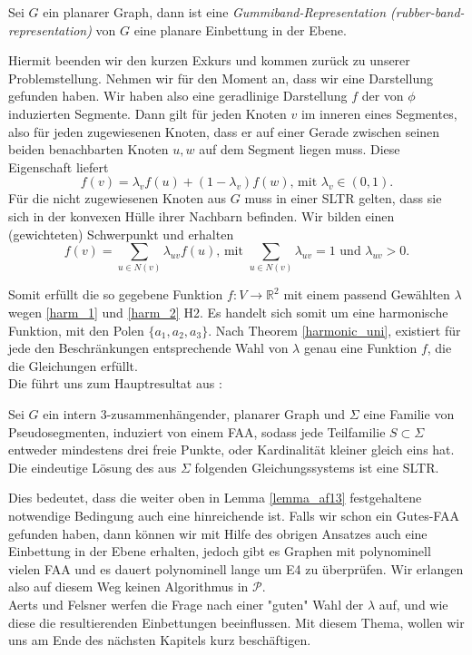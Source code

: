 \begin{theorem}
Sei $G$ ein planarer Graph, dann ist eine \textit{Gummiband-Representation (rubber-band-representation)} von $G$ eine planare Einbettung in der Ebene.
\end{theorem}

Hiermit beenden wir den kurzen Exkurs und kommen zurück zu unserer Problemstellung. Nehmen wir für den Moment an, dass wir eine Darstellung gefunden haben. Wir haben also eine geradlinige Darstellung $f$ der von $\phi$ induzierten Segmente. Dann gilt für jeden Knoten $v$ im inneren eines Segmentes, also für jeden zugewiesenen Knoten, dass er auf einer Gerade zwischen seinen beiden benachbarten Knoten $u,w$ auf dem Segment liegen muss. Diese Eigenschaft liefert
\begin{equation}\label{harm_1}
f(v) = \lambda_v f(u) + (1-\lambda_v)f(w) \text{, mit } \lambda_v \in (0,1).
\end{equation}
Für die nicht zugewiesenen Knoten aus $G$ muss in einer SLTR gelten, dass sie sich in der konvexen Hülle ihrer Nachbarn befinden. Wir bilden einen (gewichteten) Schwerpunkt und erhalten
\begin{equation}\label{harm_2}
f(v) = \sum_{u \in N(v)} \lambda_{uv} f(u) \text{, mit }  \sum_{u \in N(v)}\lambda_{uv} = 1 \text{ und } \lambda_{uv} > 0.
\end{equation}

Somit erfüllt die so gegebene Funktion $f:V\to\mathbb{R}^2$ mit einem passend Gewählten $\lambda$ wegen \ref{harm_1} und \ref{harm_2} H2. Es handelt sich somit um eine harmonische Funktion, mit den Polen $\{a_1,a_2,a_3\}$. Nach Theorem \ref{harmonic_uni}, existiert für jede den Beschränkungen entsprechende Wahl von $\lambda$ genau eine Funktion $f$, die die Gleichungen erfüllt.\\
Die führt uns zum Hauptresultat aus \cite{af13}:
\begin{theorem}
Sei $G$ ein intern 3-zusammenhängender, planarer Graph und $\Sigma$ eine Familie von Pseudosegmenten, induziert von einem FAA, sodass jede Teilfamilie $S \subset \Sigma$ entweder mindestens drei freie Punkte, oder Kardinalität kleiner gleich eins hat. Die eindeutige Lösung des aus $\Sigma$ folgenden Gleichungssystems ist eine SLTR.
\end{theorem}

\begin{remark}
Dies bedeutet, dass die weiter oben in Lemma \ref{lemma_af13} festgehaltene notwendige Bedingung auch eine hinreichende ist. Falls wir schon ein Gutes-FAA gefunden haben, dann können wir mit Hilfe des obrigen Ansatzes auch eine Einbettung in der Ebene erhalten, jedoch gibt es Graphen mit polynominell vielen FAA und es dauert polynominell lange um E4 zu überprüfen. Wir erlangen also auf diesem Weg keinen Algorithmus in $\mathcal{P}$.\\
Aerts und Felsner werfen die Frage nach einer "guten" Wahl der $\lambda$ auf, und wie diese die resultierenden Einbettungen beeinflussen. Mit diesem Thema, wollen wir uns am Ende des nächsten Kapitels kurz beschäftigen.
\end{remark}

